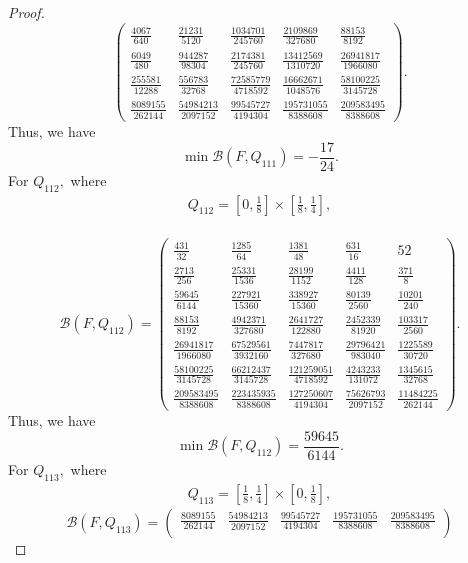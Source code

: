 \documentclass[10pt,a4paper]{amsart}
\begin{document}
\begin{proof}
\[\begin{pmatrix}
	\frac{4067}{640} & \frac{21231}{5120} & \frac{1034701}{245760} & \frac{2109869}{327680} & \frac{88153}{8192}\\[5mm]
	\frac{6049}{480} & \frac{944287}{98304} & \frac{2174381}{245760} & \frac{13412569}{1310720} & \frac{26941817}{1966080}\\[5mm]
	\frac{255581}{12288} & \frac{556783}{32768} & \frac{72585779}{4718592} & \frac{16662671}{1048576} & \frac{58100225}{3145728}\\[5mm]
	\frac{8089155}{262144} & \frac{54984213}{2097152} & \frac{99545727}{4194304} & \frac{195731055}{8388608} & \frac{209583495}{8388608}
\end{pmatrix}.
\]
Thus, we have
\[
\min \mathcal B(F,Q_{111})=-\frac{17}{24}.
\]
For $Q_{112},$ where
\begin{align*}
	Q_{112}=\left[0,\frac18\right]\times\left[\frac18,\frac14\right],
\end{align*}\\
\[
\mathcal B(F,Q_{112})=
\begin{pmatrix}
	\frac{431}{32} & \frac{1285}{64} & \frac{1381}{48} & \frac{631}{16} & 52\\[5mm]
	\frac{2713}{256} & \frac{25331}{1536} & \frac{28199}{1152} & \frac{4411}{128} & \frac{371}{8}\\[5mm]
	\frac{59645}{6144} & \frac{227921}{15360} & \frac{338927}{15360} & \frac{80139}{2560} & \frac{10201}{240}\\[5mm]
	\frac{88153}{8192} & \frac{4942371}{327680} & \frac{2641727}{122880} & \frac{2452339}{81920} & \frac{103317}{2560}\\[5mm]
	\frac{26941817}{1966080} & \frac{67529561}{3932160} & \frac{7447817}{327680} & \frac{29796421}{983040} & \frac{1225589}{30720}\\[5mm]
	\frac{58100225}{3145728} & \frac{66212437}{3145728} & \frac{121259051}{4718592} & \frac{4243233}{131072} & \frac{1345615}{32768}\\[5mm]
	\frac{209583495}{8388608} & \frac{223435935}{8388608} & \frac{127250607}{4194304} & \frac{75626793}{2097152} & \frac{11484225}{262144}
\end{pmatrix}.
\]
Thus, we have
\[
\min \mathcal B(F,Q_{112})=\frac{59645}{6144}.
\]
For $Q_{113},$ where
\begin{align*}
	Q_{113}=\left[\frac18,\frac14\right]\times\left[0,\frac18\right],
\end{align*}
\[
\mathcal B(F,Q_{113})=
\begin{pmatrix}
	\frac{8089155}{262144} & \frac{54984213}{2097152} & \frac{99545727}{4194304} & \frac{195731055}{8388608} & \frac{209583495}{8388608}\\[5mm]

\end{pmatrix}\]
\end{proof}
\end{document}
